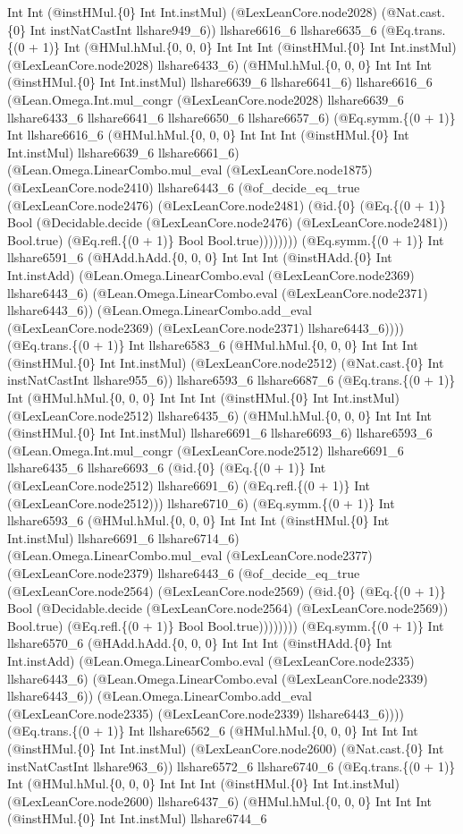 \documentclass[11pt]{article}
\begin{document}
Int Int (@instHMul.\{0\} Int Int.instMul) (@LexLeanCore.node2028) (@Nat.cast.\{0\} Int instNatCastInt llshare949\_6)) llshare6616\_6 llshare6635\_6 (@Eq.trans.\{(0 + 1)\} Int (@HMul.hMul.\{0, 0, 0\} Int Int Int (@instHMul.\{0\} Int Int.instMul) (@LexLeanCore.node2028) llshare6433\_6) (@HMul.hMul.\{0, 0, 0\} Int Int Int (@instHMul.\{0\} Int Int.instMul) llshare6639\_6 llshare6641\_6) llshare6616\_6 (@Lean.Omega.Int.mul\_congr (@LexLeanCore.node2028) llshare6639\_6 llshare6433\_6 llshare6641\_6 llshare6650\_6 llshare6657\_6) (@Eq.symm.\{(0 + 1)\} Int llshare6616\_6 (@HMul.hMul.\{0, 0, 0\} Int Int Int (@instHMul.\{0\} Int Int.instMul) llshare6639\_6 llshare6661\_6) (@Lean.Omega.LinearCombo.mul\_eval (@LexLeanCore.node1875) (@LexLeanCore.node2410) llshare6443\_6 (@of\_decide\_eq\_true (@LexLeanCore.node2476) (@LexLeanCore.node2481) (@id.\{0\} (@Eq.\{(0 + 1)\} Bool (@Decidable.decide (@LexLeanCore.node2476) (@LexLeanCore.node2481)) Bool.true) (@Eq.refl.\{(0 + 1)\} Bool Bool.true)))))))) (@Eq.symm.\{(0 + 1)\} Int llshare6591\_6 (@HAdd.hAdd.\{0, 0, 0\} Int Int Int (@instHAdd.\{0\} Int Int.instAdd) (@Lean.Omega.LinearCombo.eval (@LexLeanCore.node2369) llshare6443\_6) (@Lean.Omega.LinearCombo.eval (@LexLeanCore.node2371) llshare6443\_6)) (@Lean.Omega.LinearCombo.add\_eval (@LexLeanCore.node2369) (@LexLeanCore.node2371) llshare6443\_6)))) (@Eq.trans.\{(0 + 1)\} Int llshare6583\_6 (@HMul.hMul.\{0, 0, 0\} Int Int Int (@instHMul.\{0\} Int Int.instMul) (@LexLeanCore.node2512) (@Nat.cast.\{0\} Int instNatCastInt llshare955\_6)) llshare6593\_6 llshare6687\_6 (@Eq.trans.\{(0 + 1)\} Int (@HMul.hMul.\{0, 0, 0\} Int Int Int (@instHMul.\{0\} Int Int.instMul) (@LexLeanCore.node2512) llshare6435\_6) (@HMul.hMul.\{0, 0, 0\} Int Int Int (@instHMul.\{0\} Int Int.instMul) llshare6691\_6 llshare6693\_6) llshare6593\_6 (@Lean.Omega.Int.mul\_congr (@LexLeanCore.node2512) llshare6691\_6 llshare6435\_6 llshare6693\_6 (@id.\{0\} (@Eq.\{(0 + 1)\} Int (@LexLeanCore.node2512) llshare6691\_6) (@Eq.refl.\{(0 + 1)\} Int (@LexLeanCore.node2512))) llshare6710\_6) (@Eq.symm.\{(0 + 1)\} Int llshare6593\_6 (@HMul.hMul.\{0, 0, 0\} Int Int Int (@instHMul.\{0\} Int Int.instMul) llshare6691\_6 llshare6714\_6) (@Lean.Omega.LinearCombo.mul\_eval (@LexLeanCore.node2377) (@LexLeanCore.node2379) llshare6443\_6 (@of\_decide\_eq\_true (@LexLeanCore.node2564) (@LexLeanCore.node2569) (@id.\{0\} (@Eq.\{(0 + 1)\} Bool (@Decidable.decide (@LexLeanCore.node2564) (@LexLeanCore.node2569)) Bool.true) (@Eq.refl.\{(0 + 1)\} Bool Bool.true)))))))) (@Eq.symm.\{(0 + 1)\} Int llshare6570\_6 (@HAdd.hAdd.\{0, 0, 0\} Int Int Int (@instHAdd.\{0\} Int Int.instAdd) (@Lean.Omega.LinearCombo.eval (@LexLeanCore.node2335) llshare6443\_6) (@Lean.Omega.LinearCombo.eval (@LexLeanCore.node2339) llshare6443\_6)) (@Lean.Omega.LinearCombo.add\_eval (@LexLeanCore.node2335) (@LexLeanCore.node2339) llshare6443\_6)))) (@Eq.trans.\{(0 + 1)\} Int llshare6562\_6 (@HMul.hMul.\{0, 0, 0\} Int Int Int (@instHMul.\{0\} Int Int.instMul) (@LexLeanCore.node2600) (@Nat.cast.\{0\} Int instNatCastInt llshare963\_6)) llshare6572\_6 llshare6740\_6 (@Eq.trans.\{(0 + 1)\} Int (@HMul.hMul.\{0, 0, 0\} Int Int Int (@instHMul.\{0\} Int Int.instMul) (@LexLeanCore.node2600) llshare6437\_6) (@HMul.hMul.\{0, 0, 0\} Int Int Int (@instHMul.\{0\} Int Int.instMul) llshare6744\_6 
\end{document}
